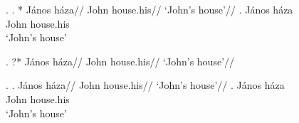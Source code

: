 \documentclass[12pt,letterpaper]{article}
\begin{document}

\ex.
\a. *
	\begingl
    \gla J\'anos h\'aza//
    \glb John house.his//
    \glft `John's house'//
    \endgl
\bg. János háza\\
     John house.his\\
    `John's house'
     
\ex. ?*
	\begingl
    \gla{}J\'anos h\'aza//
    \glb John house.his//
    \glft `John's house'//
    \endgl

\ex.
\a. 
	\begingl
    \gla J\'anos h\'aza//
    \glb John house.his//
    \glft `John's house'//
    \endgl
\bg. János háza\\
     John house.his\\
      `John's house'
\end{document}
